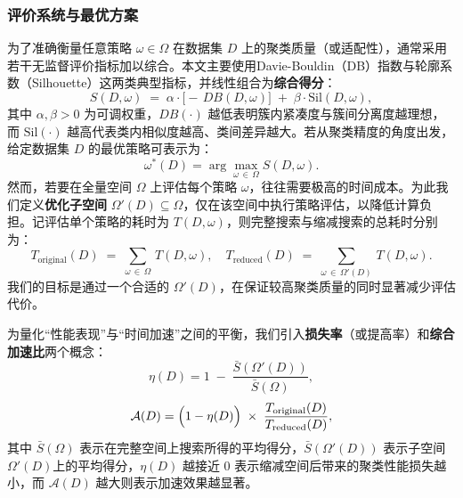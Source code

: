\documentclass[10pt]{article} %
\numberwithin{equation}{section}
\begin{document}
\subsubsection{评价系统与最优方案}
为了准确衡量任意策略 \(\omega \in \Omega\) 在数据集 \(D\) 上的聚类质量（或适配性），通常采用若干无监督评价指标加以综合。本文主要使用Davie-Bouldin（DB）指数\cite{4766909}与轮廓系数（Silhouette）\cite{ROUSSEEUW198753}这两类典型指标，并线性组合为\textbf{综合得分}：
\begin{equation}\label{eq:S-score}
  S(D,\omega)
  \;=\;
  \alpha \cdot \bigl[-\,DB(D,\omega)\bigr]
  \;+\;
  \beta \cdot \mathrm{Sil}(D,\omega),
\end{equation}
其中 \(\alpha,\beta > 0\) 为可调权重，\(DB(\cdot)\) 越低表明簇内紧凑度与簇间分离度越理想，而 \(\mathrm{Sil}(\cdot)\) 越高代表类内相似度越高、类间差异越大。若从聚类精度的角度出发，给定数据集 \(D\) 的最优策略可表示为：
\begin{equation}\label{eq:best strategy}
  \omega^*(D)
  = \arg\max_{\omega \,\in\, \Omega} S(D,\omega).
\end{equation}
然而，若要在全量空间 \(\Omega\) 上评估每个策略 \(\omega\)，往往需要极高的时间成本。为此我们定义\textbf{优化子空间} \(\Omega'(D)\subseteq \Omega\)，仅在该空间中执行策略评估，以降低计算负担。记评估单个策略的耗时为 \(T(D,\omega)\)，则完整搜索与缩减搜索的总耗时分别为：
\begin{equation}\label{eq:T-original}
  T_{\text{original}}(D)
  \;=\;
  \sum_{\omega \,\in\, \Omega} \, T(D,\omega),
\quad
  T_{\text{reduced}}(D)
  \;=\;
  \sum_{\omega \,\in\, \Omega'(D)} \, T(D,\omega).
\end{equation}
我们的目标是通过一个合适的 \(\Omega'(D)\)，在保证较高聚类质量的同时显著减少评估代价。

为量化“性能表现”与“时间加速”之间的平衡，我们引入\textbf{损失率}（或提高率）和\textbf{综合加速比}两个概念：
\begin{equation}\label{eq:loss-rate}
  \eta(D)
  =
  1 \;-\;
  \frac{\bar{S}(\Omega'(D))}{\bar{S}(\Omega)},
\end{equation}
\begin{equation}\label{eq:acc-ratio}
  \mathcal{A}(D)
  =
  \Bigl(1 - \eta(D)\Bigr)
  \;\times\;
  \frac{T_{\text{original}}(D)}{T_{\text{reduced}}(D)},
\end{equation}
其中 \(\bar{S}(\Omega)\) 表示在完整空间上搜索所得的平均得分，\(\bar{S}(\Omega'(D))\) 表示子空间\(\Omega'(D)\)上的平均得分，\(\eta(D)\) 越接近 0 表示缩减空间后带来的聚类性能损失越小，而 \(\mathcal{A}(D)\) 越大则表示加速效果越显著。
\end{document}
